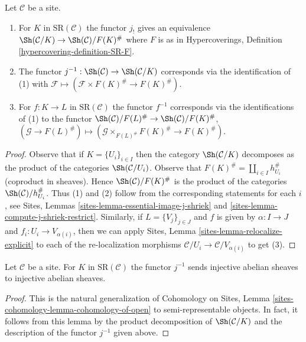 \begin{lemma}
\label{lemma-localize-compare}
Let $\mathcal{C}$ be a site.
\begin{enumerate}
\item For $K$ in $\text{SR}(\mathcal{C})$ the functor $j_!$
gives an equivalence $\Sh(\mathcal{C}/K) \to \Sh(\mathcal{C})/F(K)^\#$
where $F$ is as in
Hypercoverings, Definition \ref{hypercovering-definition-SR-F}.
\item The functor $j^{-1} : \Sh(\mathcal{C}) \to \Sh(\mathcal{C}/K)$
corresponds via the identification of (1) with
$\mathcal{F} \mapsto (\mathcal{F} \times F(K)^\# \to F(K)^\#)$.
\item For $f : K \to L$ in $\text{SR}(\mathcal{C})$ the functor
$f^{-1}$ corresponds via the identifications of (1) to the functor
$\Sh(\mathcal{C})/F(L)^\# \to \Sh(\mathcal{C})/F(K)^\#$,
$(\mathcal{G} \to F(L)^\#) \mapsto
(\mathcal{G} \times_{F(L)^\#} F(K)^\# \to F(K)^\#)$.
\end{enumerate}
\end{lemma}

\begin{proof}
Observe that if $K = \{U_i\}_{i \in I}$ then the category
$\Sh(\mathcal{C}/K)$ decomposes as the product of the categories
$\Sh(\mathcal{C}/U_i)$. Observe that
$F(K)^\# = \coprod_{i \in I} h_{U_i}^\#$ (coproduct in sheaves).
Hence $\Sh(\mathcal{C})/F(K)^\#$ is the product of the
categories $\Sh(\mathcal{C})/h_{U_i}^\#$.
Thus (1) and (2) follow from the corresponding
statements for each $i$, see
Sites, Lemmas \ref{sites-lemma-essential-image-j-shriek} and
\ref{sites-lemma-compute-j-shriek-restrict}.
Similarly, if $L = \{V_j\}_{j \in J}$ and $f$ is given
by $\alpha : I \to J$ and $f_i : U_i \to V_{\alpha(i)}$,
then we can apply
Sites, Lemma \ref{sites-lemma-relocalize-explicit}
to each of the re-localization morphisms
$\mathcal{C}/U_i \to \mathcal{C}/V_{\alpha(i)}$
to get (3).
\end{proof}

\begin{lemma}
\label{lemma-localize-injective}
Let $\mathcal{C}$ be a site. For $K$ in $\text{SR}(\mathcal{C})$
the functor $j^{-1}$ sends injective abelian sheaves to injective
abelian sheaves.
\end{lemma}

\begin{proof}
This is the natural generalization of
Cohomology on Sites, Lemma
\ref{sites-cohomology-lemma-cohomology-of-open}
to semi-representable objects.
In fact, it follows from this lemma
by the product decomposition of $\Sh(\mathcal{C}/K)$
and the description of the functor $j^{-1}$ given above.
\end{proof}

